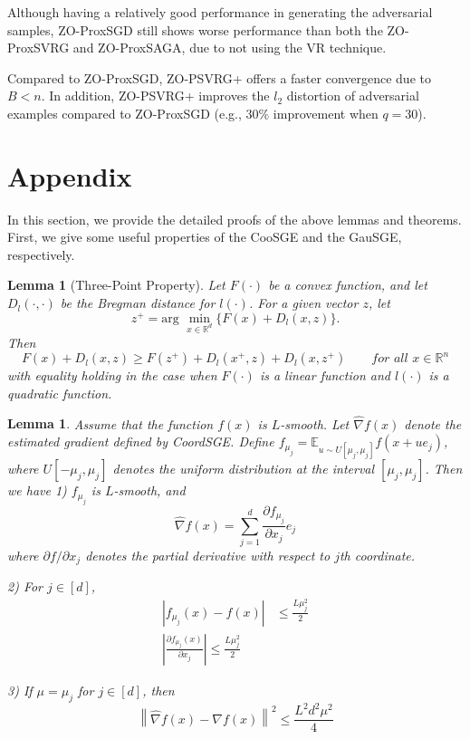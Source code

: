 \documentclass{article}
\newcommand*{\R}{\mathbb{R}}
\newcommand*{\E}{\mathbb{E}}
\newcommand{\norm}[1]{\left\lVert#1\right\rVert}
\newcommand{\abs}[1]{\left|#1\right|}
\newtheorem{lemma}[theorem]{Lemma}
\theoremstyle{definition}
\theoremstyle{remark}
\begin{document}
{\color{Green}

Although having a relatively good performance in generating the adversarial samples, ZO-ProxSGD still shows worse performance than both the ZO-ProxSVRG and ZO-ProxSAGA, due to not using the VR technique.}
{\color{Brown}
Compared to ZO-ProxSGD, ZO-PSVRG+ offers a faster convergence due to $B < n$. In addition, ZO-PSVRG+ improves the $l_2$ distortion
of adversarial examples compared to ZO-ProxSGD (e.g., $30\%$ improvement when $q = 30$). 
}

\section{Appendix}
{\color{Green}
In this section, we provide the detailed proofs of the above lemmas and theorems. First, we give some useful properties of the CooSGE and the GauSGE, respectively.
}
\begin{lemma}[Three-Point Property] Let $F(\cdot)$ be a convex function, and let $D_{l}(\cdot,\cdot)$ be the Bregman distance for $l(\cdot)$. For a given vector $z$, let 
\[
z^+ = \text{arg}\,\,\min_{x\in\R^d}\{F(x)+D_{l}(x,z)\}.
\]
Then 
\begin{equation}
F(x) + D_l(x,z) \geq F(z^+) + D_l(x^+,z) + D_l(x,z^+)\qquad for\,\,all\,\,x\in\R^n
\end{equation}
with equality holding in the case when $F(\cdot)$ is a linear function and $l(\cdot)$ is a quadratic function.
\end{lemma}


\begin{lemma}\label{CooSGE}
Assume that the function $f(x)$ is $L$-smooth. Let $\hat{\nabla} f(x)$ denote the estimated gradient defined by CoordSGE. Define $f_{\mu_j} = \E_{u\sim U[\mu_j, \mu_j]} f(x+ue_j)$, where $U[-\mu_j,\mu_j]$ denotes the uniform distribution at the interval $[\mu_j, \mu_j]$. Then we have 
1) $f_{\mu_j}$ is $L$-smooth, and 
\begin{equation}
\hat{\nabla} f(x) = \sum_{j=1}^d \frac{\partial f_{\mu_j}}{\partial x_j}e_j
\end{equation} 
where $\partial f/\partial x_j$ denotes the partial derivative with respect to $j$th coordinate.

2) For $j\in [d]$, 
\begin{align}
\abs{f_{\mu_j}(x) - f(x)} &\leq \frac{L\mu_j^2}{2}\\
\abs{\frac{\partial f_{\mu_j}(x)}{\partial x_j}} \leq \frac{L\mu_j^2}{2}
\end{align}
 
 3) If $\mu = \mu_j$ for $j\in [d]$, then 
 \begin{equation}
 \norm{\hat{\nabla} f(x) - {\nabla} f(x)} ^2 \leq \frac{L^2 d^2 \mu^2}{4}
\end{equation}  
\end{lemma}
\end{document}
